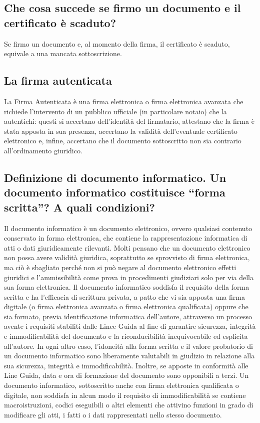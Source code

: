 \subsection{Che cosa succede se firmo un documento e il certificato è scaduto?}
Se firmo un documento e, al momento della firma, il certificato è scaduto, equivale a una mancata sottoscrizione.

\subsection{La firma autenticata}
La Firma Autenticata è una firma elettronica o firma elettronica avanzata che richiede
l’intervento di un pubblico ufficiale (in particolare notaio) che la autentichi:
questi si accertano dell’identità del firmatario, attestano che la firma è stata apposta in sua presenza,
accertano la validità dell’eventuale certificato elettronico e, infine, accertano che il documento sottoscritto
non sia contrario all’ordinamento giuridico.

\subsection{Definizione di documento informatico. Un documento informatico costituisce “forma scritta”? A quali condizioni?}
Il documento informatico è un documento elettronico, ovvero qualsiasi
contenuto conservato in forma elettronica, che contiene la rappresentazione informatica
di atti o dati giuridicamente rilevanti. Molti pensano che un documento elettronico
non possa avere validità giuridica, soprattutto se sprovvisto di firma elettronica,
ma ciò è sbagliato perché non si può negare al documento elettronico effetti giuridici
e l’ammissibilità come prova in procedimenti giudiziari solo per via della sua forma elettronica.
Il documento informatico soddisfa il requisito della forma scritta e ha l’efficacia di scrittura privata,
a patto che vi sia apposta una firma digitale (o firma elettronica avanzata o firma elettronica qualificata)
oppure che sia formato, previa identificazione informatica dell’autore, attraverso
un processo avente i requisiti stabiliti dalle Linee Guida al fine di garantire sicurezza,
integrità e immodificabilità del documento e la riconducibilità inequivocabile ed esplicita all’autore.
\newline In ogni altro caso, l’idoneità alla forma scritta e il valore probatorio di un documento informatico
sono liberamente valutabili in giudizio in relazione alla sua sicurezza, integrità e immodificabilità.
Inoltre, se apposte in conformità alle Line Guida, data e ora di formazione del documento sono opponibili a terzi.
Un documento informatico, sottoscritto anche con firma elettronica qualificata o digitale, non soddisfa
in alcun modo il requisito di immodificabilità se contiene macroistruzioni, codici eseguibili o altri
elementi che attivino funzioni in grado di modificare gli atti, i fatti o i dati rappresentati nello stesso documento.


